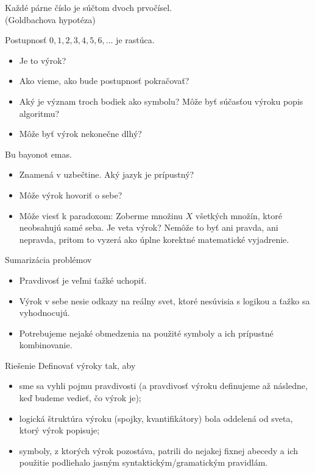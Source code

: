 \documentclass[12pt]{beamer}
\theoremstyle{definition}
\begin{document}
\begin{frame}
Každé párne číslo je súčtom dvoch prvočísel.
\\(Goldbachova hypotéza)
\end{frame}

\begin{frame}
Postupnosť $0,1,2,3,4,5,6,\dots$ je rastúca.
\begin{itemize}
\item Je to výrok?
\pause
\item Ako vieme, ako bude postupnosť pokračovať?
\pause
\item Aký je význam troch bodiek ako symbolu? Môže byť súčasťou výroku popis algoritmu?
\pause
\item Môže byť výrok nekonečne dlhý?
\end{itemize}
\end{frame}

\begin{frame}
Bu bayonot emas.
\begin{itemize}
\item Znamená  v uzbečtine. Aký jazyk je prípustný?
\pause
\item Môže výrok hovoriť o sebe?
\item Môže viesť k paradoxom: Zoberme množinu $X$ všetkých množín, ktoré neobsahujú samé seba.
Je veta  výrok? Nemôže to byť ani pravda, ani nepravda,
pritom to vyzerá ako úplne korektné matematické vyjadrenie.
\end{itemize}
\end{frame}

\begin{frame}{Sumarizácia problémov}
\begin{itemize}
\item Pravdivosť je veľmi ťažké uchopiť.
\item Výrok v sebe nesie odkazy na reálny svet, ktoré nesúvisia s logikou a ťažko sa vyhodnocujú.
\item Potrebujeme nejaké obmedzenia na použité symboly a ich prípustné kombinovanie.
\end{itemize}
\end{frame}

\begin{frame}{Riešenie}
Definovať výroky tak, aby
\begin{itemize}
\item sme sa vyhli pojmu pravdivosti (a pravdivosť výroku definujeme až následne, keď budeme vedieť, čo výrok je);
\pause
\item logická štruktúra výroku (spojky, kvantifikátory) bola oddelená od sveta, ktorý výrok popisuje;
\pause
\item symboly, z ktorých výrok pozostáva, patrili do nejakej fixnej abecedy a ich použitie podliehalo jasným syntaktickým/gramatickým pravidlám.
\end{itemize}
\end{frame}
\end{document}
